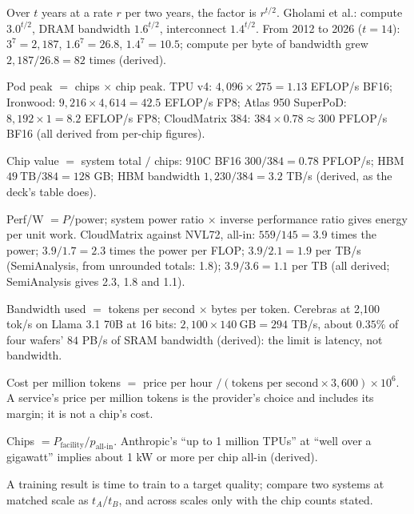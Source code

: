 \documentclass[11pt,letterpaper]{article}
\begin{document}
\begin{description}[leftmargin=0pt,labelindent=0pt,itemsep=6pt,font=\normalfont\bfseries\sffamily]
\item[Growth rates.] Over $t$ years at a rate $r$ per two years, the factor is $r^{t/2}$. Gholami et al.: compute $3.0^{t/2}$, DRAM bandwidth $1.6^{t/2}$, interconnect $1.4^{t/2}$. From 2012 to 2026 ($t = 14$): $3^7 = 2{,}187$, $1.6^7 = 26.8$, $1.4^7 = 10.5$; compute per byte of bandwidth grew $2{,}187/26.8 = 82$ times (derived).
\item[Pod and rack totals.] Pod peak $=$ chips $\times$ chip peak. TPU v4: $4{,}096\times275 = 1.13$ EFLOP/s BF16; Ironwood: $9{,}216\times4{,}614 = 42.5$ EFLOP/s FP8; Atlas 950 SuperPoD: $8{,}192\times1 = 8.2$ EFLOP/s FP8; CloudMatrix 384: $384\times0.78 \approx 300$ PFLOP/s BF16 (all derived from per-chip figures).
\item[Per-chip from totals.] Chip value $=$ system total $/$ chips: 910C BF16 $300/384 = 0.78$ PFLOP/s; HBM $49\ \mathrm{TB}/384 = 128$ GB; HBM bandwidth $1{,}230/384 = 3.2$ TB/s (derived, as the deck's table does).
\item[Efficiency ratios.] Perf/W $= P/\text{power}$; system power ratio $\times$ inverse performance ratio gives energy per unit work. CloudMatrix against NVL72, all-in: $559/145 = 3.9$ times the power; $3.9/1.7 = 2.3$ times the power per FLOP; $3.9/2.1 = 1.9$ per TB/s (SemiAnalysis, from unrounded totals: 1.8); $3.9/3.6 = 1.1$ per TB (all derived; SemiAnalysis gives 2.3, 1.8 and 1.1).
\item[Achieved bandwidth from a measured speed.] Bandwidth used $=$ tokens per second $\times$ bytes per token. Cerebras at 2{,}100 tok/s on Llama 3.1 70B at 16 bits: $2{,}100\times140\ \mathrm{GB} = 294$ TB/s, about $0.35\%$ of four wafers' $84$ PB/s of SRAM bandwidth (derived): the limit is latency, not bandwidth.
\item[Cost per token.] Cost per million tokens $=$ price per hour $/(\text{tokens per second}\times3{,}600)\times10^6$. A service's price per million tokens is the provider's choice and includes its margin; it is not a chip's cost.
\item[Facility power to chips.] Chips $= P_{\text{facility}}/p_{\text{all-in}}$. Anthropic's ``up to 1 million TPUs'' at ``well over a gigawatt'' implies about 1 kW or more per chip all-in (derived).
\item[MLPerf.] A training result is time to train to a target quality; compare two systems at matched scale as $t_A/t_B$, and across scales only with the chip counts stated.
\end{description}

\clearpage
\end{document}
